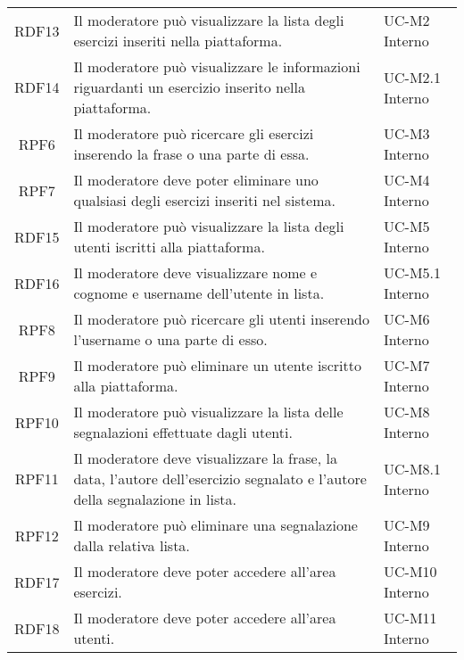 \begin{tabularx}{\textwidth}{| c | p{10cm} | X |}
		RDF13 & Il moderatore può visualizzare la lista degli esercizi inseriti nella piattaforma. & UC-M2 \newline Interno\\
		RDF14 & Il moderatore può visualizzare le informazioni riguardanti un esercizio inserito nella piattaforma. & UC-M2.1 \newline Interno\\
		RPF6 & Il moderatore può ricercare gli esercizi inserendo la frase o una parte di essa. & UC-M3 \newline Interno\\
		RPF7 & Il moderatore deve poter eliminare uno qualsiasi degli esercizi inseriti nel sistema. & UC-M4 \newline Interno\\
		RDF15 & Il moderatore può visualizzare la lista degli utenti iscritti alla piattaforma. & UC-M5 \newline Interno\\
		RDF16 & Il moderatore deve visualizzare nome e cognome e username dell'utente in lista. & UC-M5.1 \newline Interno\\
		RPF8 & Il moderatore può ricercare gli utenti inserendo l'username o una parte di esso. & UC-M6 \newline Interno\\
		RPF9 & Il moderatore può eliminare un utente iscritto alla piattaforma. & UC-M7 \newline Interno\\
		RPF10 & Il moderatore può visualizzare la lista delle segnalazioni effettuate dagli utenti. & UC-M8 \newline Interno\\
		RPF11 & Il moderatore deve visualizzare la frase, la data, l'autore dell'esercizio segnalato e l'autore della segnalazione in lista. & UC-M8.1 \newline Interno\\
		RPF12 & Il moderatore può eliminare una segnalazione dalla relativa lista. & UC-M9 \newline Interno\\
		RDF17 & Il moderatore deve poter accedere all'area esercizi. & UC-M10 \newline Interno\\
		RDF18 & Il moderatore deve poter accedere all'area utenti. & UC-M11 \newline Interno\\
		

\end{tabularx}
